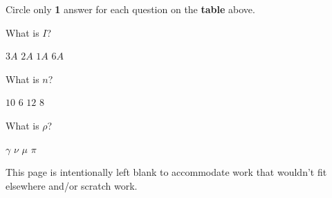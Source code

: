 \documentclass[letterpaper,12pt,addpoints]{exam}
\begin{document}
\medskip
\noindent
\begin{description}
\item Circle only \textbf{1} answer for each question on the \textbf{table} above. \\
\end{description}
\clearpage

\begin{questions}

\question What is $I$?

\begin{oneparchoices}
\choice $3A$ 
\choice $2A$
\CorrectChoice $1A$ 
\choice $6A$ 
\end{oneparchoices}

\question What is $n$?

\begin{oneparchoices}
\choice $10$ 
\CorrectChoice $6$
\choice $12$ 
\choice $8$ 
\end{oneparchoices}

\question What is $\rho$?

\begin{oneparchoices}
\choice $\gamma$
\choice $\nu$ 
\CorrectChoice $\mu$ 
\choice $\pi$ 
\end{oneparchoices}

\end{questions}

\clearpage
This page is intentionally left blank to accommodate work that wouldn't fit elsewhere and/or scratch work.
\end{document}
